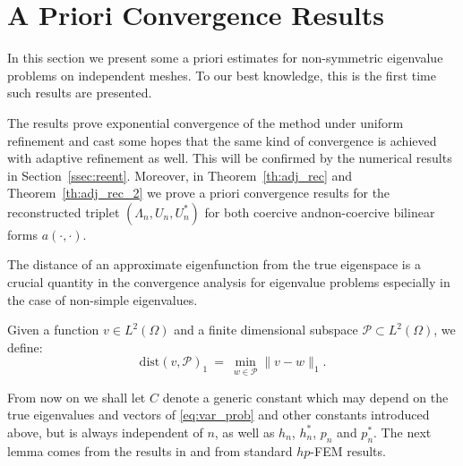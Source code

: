 \documentclass[smallextended]{svjour3}
\begin{document}
\section{A Priori Convergence Results}\label{sse:pcf_priori}\label{sec:aprio}



In this section  we present some a priori estimates for non-symmetric eigenvalue
problems on independent meshes. To our best knowledge, this is the first time such results are presented. 

The results prove exponential convergence of the method under uniform refinement and cast some hopes that the same kind of convergence is achieved with adaptive refinement as well. This will be confirmed by the numerical results in Section~\ref{ssec:reent}. 
Moreover, in Theorem~\ref{th:adj_rec} and Theorem~\ref{th:adj_rec_2} we prove a priori convergence results for the 
reconstructed triplet $(\Lambda_n,U_n,U_n^*)$ for both coercive andnon-coercive bilinear forms $a(\cdot,\cdot)$.



The distance of an approximate eigenfunction from the true eigenspace
is a crucial quantity in the convergence analysis for
eigenvalue problems  especially in the case of non-simple
eigenvalues.

\begin{definition}
\label{def:dist_h1}
Given a function $v\in L^2(\Omega)$ and a finite dimensional subspace $\mathcal{P}\subset L^2(\Omega)$, we define:
$$
\mathrm{dist}(v,\mathcal{P})_{1}\ =\ \min_{ w\in\mathcal{P}}  \|v-w\|_{1} .
$$

\end{definition}
From now on we shall let $C$ denote  a generic constant which 
may depend
on the 
true eigenvalues and vectors of \eqref{eq:var_prob} and other
constants introduced above, but is always independent of
$n$, as well as $h_n$, $h^*_n$, $p_n$ and $p^*_n$.  
The next lemma comes from the results in \cite{babuska}
and from standard $hp$-FEM results.
\end{document}
